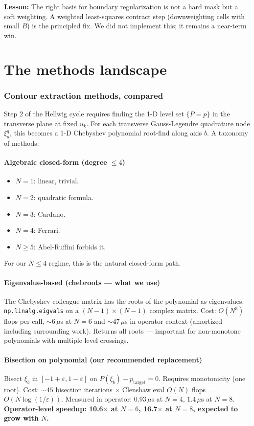 \documentclass[11pt]{article}
\begin{document}
\textbf{Lesson:} The right basis for boundary regularization is not a hard mask but a
soft weighting. A weighted least-squares contract step (downweighting cells with small
$B$) is the principled fix. We did not implement this; it remains a near-term win.

\newpage
\part{The methods landscape}

\section{Contour extraction methods, compared}\label{sec:contour}

Step 2 of the Hellwig cycle requires finding the 1-D level set $\{P=p\}$ in the
transverse plane at fixed $u_k$. For each transverse Gauss-Legendre quadrature node
$\xi_a^q$, this becomes a 1-D Chebyshev polynomial root-find along axis $b$.
A taxonomy of methods:

\subsection{Algebraic closed-form (degree $\le 4$)}
\begin{itemize}
\item $N=1$: linear, trivial.
\item $N=2$: quadratic formula.
\item $N=3$: Cardano.
\item $N=4$: Ferrari.
\item $N\ge 5$: Abel-Ruffini forbids it.
\end{itemize}
For our $N\le 4$ regime, this is the natural closed-form path.

\subsection{Eigenvalue-based (chebroots — what we use)}
The Chebyshev colleague matrix has the roots of the polynomial as eigenvalues.
\texttt{np.linalg.eigvals} on a $(N{-}1)\times(N{-}1)$ complex matrix.
Cost: $O(N^3)$ flops per call, $\sim 6\,\mu$s at $N=6$ and $\sim 47\,\mu$s in operator
context (amortized including surrounding work). Returns all roots — important for
non-monotone polynomials with multiple level crossings.

\subsection{Bisection on polynomial (our recommended replacement)}
Bisect $\xi_b$ in $[-1+\varepsilon, 1-\varepsilon]$ on $P(\xi_b) - p_{\mathrm{target}} = 0$.
Requires monotonicity (one root). Cost: $\sim 45$ bisection iterations $\times$ Clenshaw eval
$O(N)$ flops = $O(N\log(1/\varepsilon))$. Measured in operator: $0.93\,\mu$s at $N=4$,
$1.4\,\mu$s at $N=8$. \textbf{Operator-level speedup: 10.6$\times$ at $N=6$, 16.7$\times$ at $N=8$,
expected to grow with $N$.}
\end{document}
